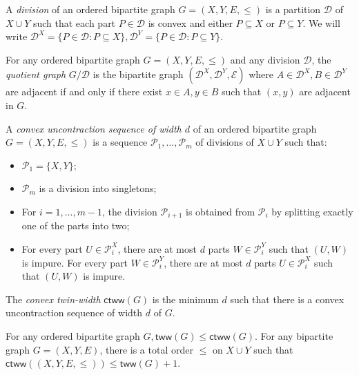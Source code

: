 \documentclass{article}
\newcommand{\cD}{\ensuremath{\mathcal{D}}}
\newcommand{\cE}{\ensuremath{\mathcal{E}}}
\newcommand{\cP}{\ensuremath{\mathcal{P}}}
\newcommand{\tw}{\mathsf{tww}}
\begin{document}
\begin{definition}[Division]
A \emph{division} of an ordered bipartite graph $G = (X,Y,E,\leq)$ is a partition $\cD$ of $X \cup
Y$ such that each part $P \in \cD$ is convex and either $P \subseteq X$ or $P \subseteq Y$. We will
write $\cD^X = \{ P \in \cD : P \subseteq X \}, \cD^Y = \{ P \in \cD : P \subseteq Y \}$.
\end{definition}

\begin{definition}
For any ordered bipartite graph $G = (X,Y,E, \leq)$ and any division $\cD$, the \emph{quotient graph}
$G/\cD$ is the bipartite graph $(\cD^X, \cD^Y, \cE)$ where $A \in \cD^X, B \in \cD^Y$ are
adjacent if and only if there exist $x \in A, y \in B$ such that $(x,y)$ are adjacent in $G$.
\end{definition}


\newcommand{\ctw}{\mathsf{ctww}}
\begin{definition}
A \emph{convex uncontraction sequence of width $d$} of an ordered bipartite graph $G = (X,Y,E,\leq)$
is a sequence $\cP_1, \dotsc, \cP_m$ of divisions of $X \cup Y$ such that:
\begin{itemize}
\item $\cP_1 = \{ X, Y \}$;
\item $\cP_m$ is a division into singletons;
\item For $i = 1, \dotsc, m-1$, the division $\cP_{i+1}$ is obtained from $\cP_i$ by splitting
exactly one of the parts into two;
\item For every part $U \in \cP_i^X$, there are at most $d$ parts $W \in \cP_i^Y$ such that $(U,W)$
is impure. For every part $W \in \cP_i^Y$, there are at most $d$ parts $U \in \cP_i^X$ such that
$(U,W)$ is impure.
\end{itemize}
The \emph{convex twin-width} $\ctw(G)$ is the minimum $d$ such that there is a convex uncontraction
sequence of width $d$ of $G$.
\end{definition}

\begin{lemma}
\label{lemma:convex twin width}
For any ordered bipartite graph $G, \tw(G) \leq \ctw(G)$. For any bipartite graph $G = (X,Y,E)$,
there is a total order $\leq$ on $X \cup Y$ such that $\ctw((X,Y,E,{\leq})) \leq \tw(G)+1$.
\end{lemma}
\end{document}
